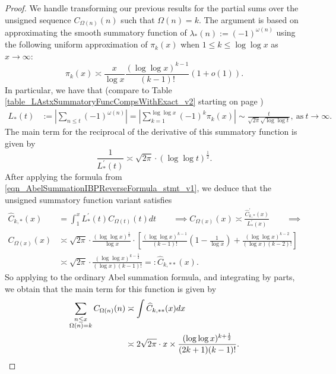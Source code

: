 \documentclass[11pt,reqno,a4letter]{article}
\numberwithin{figure}{section}
\numberwithin{table}{section}
\theoremstyle{plain}
\numberwithin{theorem}{section}
\theoremstyle{definition}
\begin{document}
\begin{proof}
We handle transforming our previous results for the partial sums over the unsigned sequence 
$C_{\Omega(n)}(n)$ such that $\Omega(n) = k$. 
The argument is based on approximating the smooth summatory function of 
$\lambda_{\ast}(n) := (-1)^{\omega(n)}$ using the following 
uniform approximation of $\pi_k(x)$ when $1 \leq k \leq \log\log x$ as 
$x \rightarrow \infty$: 
\[
\pi_k(x) \asymp \frac{x}{\log x} \frac{(\log\log x)^{k-1}}{(k-1)!} (1 + o(1)). 
\]
In particular, we have that 
(compare to Table \ref{table_LAstxSummatoryFuncCompsWithExact_v2} starting on page 
\pageref{table_LAstxSummatoryFuncCompsWithExact_v2}) 
\begin{align*} 
L_{\ast}(t) & := \left\lvert \sum_{n \leq t} (-1)^{\omega(n)} \right\rvert = 
     \left\lvert \sum_{k=1}^{\log\log x} (-1)^{k} \pi_k(x) \right\rvert \sim 
     \frac{t}{\sqrt{2\pi} \sqrt{\log\log t}}, \mathrm{\ as\ } t \rightarrow \infty. 
\end{align*} 
The main term for the reciprocal of the derivative of this summatory function is given by 
\[
\frac{1}{L_{\ast}^{\prime}(t)} \asymp \sqrt{2\pi} \cdot (\log\log t)^{\frac{1}{2}}. 
\]
After applying the formula from \eqref{eqn_AbelSummationIBPReverseFormula_stmt_v1},  
we deduce that the unsigned summatory function variant satisfies 
\begin{align*} 
\widehat{C}_{k,\ast}(x) & = \int_1^{x} L_{\ast}^{\prime}(t) C_{\Omega(t)}(t) dt \qquad \implies 
C_{\Omega(x)}(x) \asymp \frac{\widehat{C}_{k,\ast}^{\prime}(x)}{L_{\ast}^{\prime}(x)} \qquad \implies \\ 
C_{\Omega(x)}(x) & \asymp \sqrt{2\pi} \cdot \frac{(\log\log x)^{\frac{1}{2}}}{\log x} \cdot  
     \left[\frac{(\log\log x)^{k-1}}{(k-1)!} \left(1 - 
     \frac{1}{\log x}\right) + \frac{(\log\log x)^{k-2}}{(\log x) (k-2)!}\right] \\ 
     & \asymp \sqrt{2\pi} \cdot \frac{(\log\log x)^{k-\frac{1}{2}}}{(\log x) (k-1)!} 
     =: \widehat{C}_{k,\ast\ast}(x). 
\end{align*} 
So applying to the ordinary Abel summation formula, and integrating by parts, we obtain that 
the main term for this function is given by 
\begin{align*} 
\sum_{\substack{n \leq x \\ \Omega(n)=k}} C_{\Omega(n)}(n) & \asymp 
     \int \widehat{C}_{k,\ast\ast}(x)dx \\ 
     & \asymp 2\sqrt{2\pi} \cdot x \times 
     \frac{(\log\log x)^{k+\frac{1}{2}}}{(2k+1)(k-1)!}. 
     \qedhere 
\end{align*} 
\end{proof}
\end{document}
